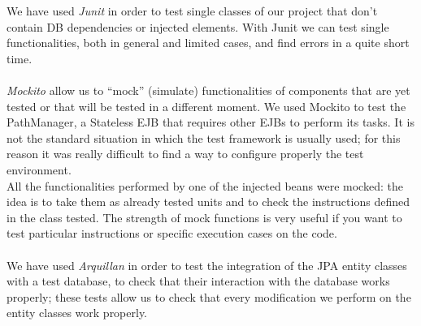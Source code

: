 We have used \textit{Junit} in order to test single classes of our project that don't contain DB dependencies or injected elements. With Junit we can test single functionalities, both in general and limited cases, and find errors in a quite short time. \\\\
\textit{Mockito} allow us to “mock” (simulate) functionalities of components that are yet tested or that will be tested in a different moment. We used Mockito to test the PathManager, a Stateless EJB that requires other EJBs to perform its tasks. It is not the standard situation in which the test framework is usually used; for this reason it was really difficult to find a way to configure properly the test environment.\\
All the functionalities performed by one of the injected beans were mocked: the idea is to take them as already tested units and to check the instructions defined in the class tested. The strength of mock functions is very useful if you want to test particular instructions or specific execution cases on the code. \\ \\
We have used \textit{Arquillan} in order to test the integration of the JPA entity classes with a test database, to check that their interaction with the database works properly; these tests allow us to check that every modification we perform on the entity classes work properly. 
